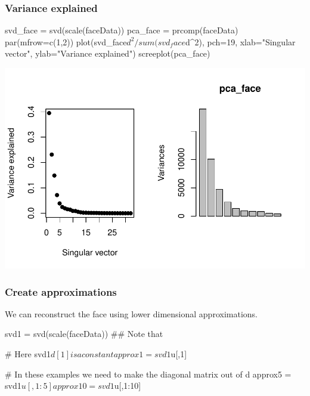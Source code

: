 \documentclass[a4paper]{article}\usepackage[]{graphicx}\usepackage[]{xcolor}
\makeatletter
\def\maxwidth{ %
  \ifdim\Gin@nat@width>\linewidth
    \linewidth
  \else
    \Gin@nat@width
  \fi
}
\makeatother
\begin{document}
\subsubsection{Variance explained}
\begin{Schunk}
\begin{Sinput}
svd_face = svd(scale(faceData))
pca_face = prcomp(faceData)
par(mfrow=c(1,2))
plot(svd_face$d^2/sum(svd_face$d^2),
     pch=19,
     xlab="Singular vector",
     ylab="Variance explained")
screeplot(pca_face)
\end{Sinput}


{\centering \includegraphics[width=\maxwidth]{figure/listings-unnamed-chunk-492-1} 

}

\end{Schunk}
\subsubsection{Create approximations}
We can reconstruct the face using lower dimensional approximations.
\begin{Schunk}
\begin{Sinput}
svd1 = svd(scale(faceData))
## Note that %

# Here svd1$d[1] is a constant
approx1 = svd1$u[,1] %

# In these examples we need to make the diagonal matrix out of d
approx5 = svd1$u[,1:5] %
approx10 = svd1$u[,1:10] %
\end{Sinput}
\end{Schunk}
\end{document}
